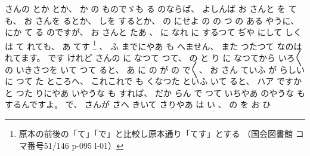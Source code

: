 さんの
とか
とか、
%
か
の
ものでゞも
る
のならば、
%
よしんば
お
さんと
を
ても、
%
お
さんを
るとか、
%
しを
するとか、
%
の
にせよ
の
%
の
つ
の
ある
やうに、
%
にか
て
る
のですが、
%
お
さんと
たあ
、
%
に
なれ
に
するつて
ぢや
にして
しくは
て
れても、
%
あ
てす
\footnote{原本の前後の「て」「で」と比較し原本通り「てす」とする
（国会図書館 コマ番号51/146 p-095 l-01）}%
、
%
ふ
までにやあ
も
へません、
%
また
つたつて
なのは
れてます。
%
です
けれど
さんの
に
なつて
つて、
%
の
と
り
に
なつてから
いろ〳〵の
いきさつを
いて
つて
ると、
%
あ
に
の
が
の
で〳〵、
%
お
さん
ていふ
が
%
らしい
に
つて
た
ところへ、
%
これこれで%
も
くなつた
といふ
いて
ると、
ハア
ですかと
つた
りにやあ
いやうな
も
すれば、
%
だか
らん
で
つて
いちやあ
のやうな
も
するんですよ。
%
で、
%
さんが
さへ
きいて
さりやあ
は
い
、
%
の
を
お
ひ
